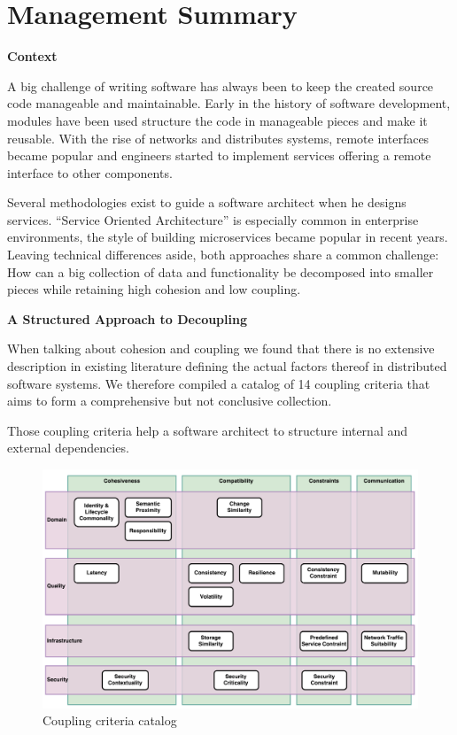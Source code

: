 \chapter{Management Summary}


\textbf{Context}

A big challenge of writing software has always been to keep the created source code manageable and maintainable. Early in the history of software development, modules have been used structure the code in manageable pieces and make it reusable. With the rise of networks and distributes systems, remote interfaces became popular and engineers started to implement services offering a remote interface to other components.

Several methodologies exist to guide a software architect when he designs services. \enquote{Service Oriented Architecture} is especially common in enterprise environments, the style of building microservices became popular in recent years. Leaving technical differences aside, both approaches share a common challenge: How can a big collection of data and functionality be decomposed into smaller pieces while retaining high cohesion and low coupling.

\textbf{A Structured Approach to Decoupling}

When talking about cohesion and coupling we found that there is no extensive description in existing literature defining the actual factors thereof in distributed software systems. We therefore compiled a catalog of 14 coupling criteria that aims to form a comprehensive but not conclusive collection. 

Those coupling criteria help a software architect to structure internal and external dependencies. 


\begin{figure}[H]
	\includegraphics[scale=0.4]{diagrams/CouplingCatalog.pdf}
	\caption{Coupling criteria catalog}
	\label{fig:cc-catalog-mgmt-summary}
\end{figure}

